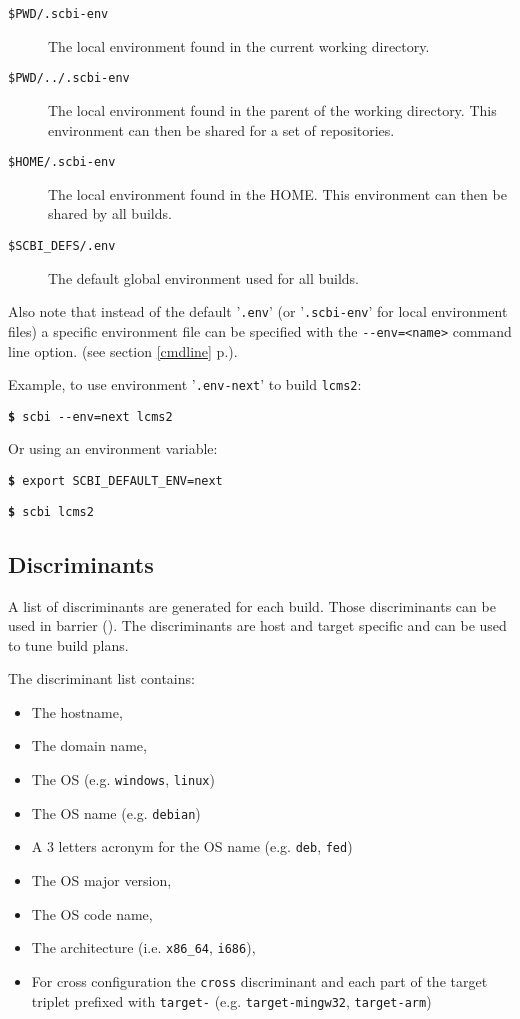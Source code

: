 \documentclass[a4paper,12pt,twoside]{article}
\newcommand{\code}[1]{\texttt{#1}}
\newcommand{\seeref}[1]{see section \ref{#1} p.\pageref{#1}}
\newcommand{\file}[1]{'{\texttt{#1}}'}
\newcommand{\cmd}[1]{\tabto{1cm}\hspace{0.5cm}\texttt{\textbf{\$} #1}}
\newcommand{\ddash}{-{}-}
\begin{document}
\begin{description}
	\item[\code{\$PWD/.scbi-env}] The local environment found in the current working directory.

	\item[\code{\$PWD/../.scbi-env}] The local environment found in the parent of the working directory. This environment can then be shared for a set of repositories.

	\item[\code{\$HOME/.scbi-env}] The local environment found in the HOME. This environment can then be shared by all builds.

	\item[\code{\$SCBI\_DEFS/.env}] The default global environment used for all builds.
\end{description}

Also note that instead of the default \file{.env} (or \file{.scbi-env} for local environment files) a specific environment file can be specified with the \code{\ddash{}env=<name>} command line option. (\seeref{cmdline}).

Example, to use environment \file{.env-next} to build \code{lcms2}:

\cmd{scbi \ddash{}env=next lcms2}

Or using an environment variable:

\cmd{export SCBI\_DEFAULT\_ENV=next}

\cmd{scbi lcms2}

\subsection{Discriminants}
\label{discriminants}

A list of discriminants are generated for each build. Those discriminants can be used in barrier (). The discriminants are host and target specific and can be used to tune build plans.

The discriminant list contains:

\begin{itemize}
	\item The hostname,
	\item The domain name,
	\item The OS (e.g. \code{windows}, \code{linux})
	\item The OS name (e.g. \code{debian})
	\item A 3 letters acronym for the OS name (e.g. \code{deb}, \code{fed})
	\item The OS major version,
	\item The OS code name,
	\item The architecture (i.e. \code{x86\_64}, \code{i686}),
	\item For cross configuration the \code{cross} discriminant and each part of the target triplet prefixed with \code{target-} (e.g. \code{target-mingw32}, \code{target-arm})
\end{itemize}
\end{document}
